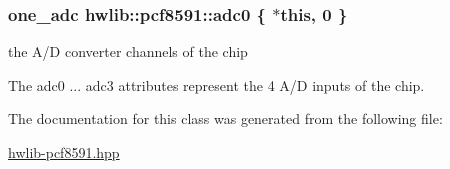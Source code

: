 \subsubsection[{\texorpdfstring{adc0}{adc0}}]{\setlength{\rightskip}{0pt plus 5cm}one\+\_\+adc hwlib\+::pcf8591\+::adc0 \{ $\ast$this, 0 \}}\hypertarget{classhwlib_1_1pcf8591_a29a87f5711fbbd85ed5c477a5eab1b6f}{}\label{classhwlib_1_1pcf8591_a29a87f5711fbbd85ed5c477a5eab1b6f}


the A/D converter channels of the chip 

The adc0 ... adc3 attributes represent the 4 A/D inputs of the chip. 

The documentation for this class was generated from the following file\+:\begin{DoxyCompactItemize}
\item 
\hyperlink{hwlib-pcf8591_8hpp}{hwlib-\/pcf8591.\+hpp}\end{DoxyCompactItemize}
